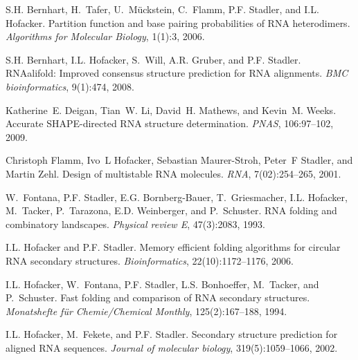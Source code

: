 
\begin{DoxyDescription}
\item[\label{_CITEREF_bernhart:2006}%
\mbox{[}1\mbox{]}]S.\+H. Bernhart, H.~Tafer, U.~M\"{u}ckstein, C.~Flamm, P.\+F. Stadler, and I.\+L. Hofacker. Partition function and base pairing probabilities of R\+N\+A heterodimers. {\itshape Algorithms for Molecular Biology}, 1(1)\+:3, 2006.


\item[\label{_CITEREF_bernhart:2008}%
\mbox{[}2\mbox{]}]S.\+H. Bernhart, I.\+L. Hofacker, S.~Will, A.\+R. Gruber, and P.\+F. Stadler. R\+N\+Aalifold\+: Improved consensus structure prediction for R\+N\+A alignments. {\itshape B\+M\+C bioinformatics}, 9(1)\+:474, 2008.


\item[\label{_CITEREF_deigan:2009}%
\mbox{[}3\mbox{]}]Katherine~E. Deigan, Tian~W. Li, David~H. Mathews, and Kevin~M. Weeks. Accurate S\+H\+A\+P\+E-\/directed R\+N\+A structure determination. {\itshape P\+N\+A\+S}, 106\+:97--102, 2009.


\item[\label{_CITEREF_flamm:2001}%
\mbox{[}4\mbox{]}]Christoph Flamm, Ivo~L Hofacker, Sebastian Maurer-\/\+Stroh, Peter~F Stadler, and Martin Zehl. Design of multistable R\+N\+A molecules. {\itshape R\+N\+A}, 7(02)\+:254--265, 2001.


\item[\label{_CITEREF_fontana:1993b}%
\mbox{[}5\mbox{]}]W.~Fontana, P.\+F. Stadler, E.\+G. Bornberg-\/\+Bauer, T.~Griesmacher, I.\+L. Hofacker, M.~Tacker, P.~Tarazona, E.\+D. Weinberger, and P.~Schuster. R\+N\+A folding and combinatory landscapes. {\itshape Physical review E}, 47(3)\+:2083, 1993.


\item[\label{_CITEREF_hofacker:2006}%
\mbox{[}6\mbox{]}]I.\+L. Hofacker and P.\+F. Stadler. Memory efficient folding algorithms for circular R\+N\+A secondary structures. {\itshape Bioinformatics}, 22(10)\+:1172--1176, 2006.


\item[\label{_CITEREF_hofacker:1994}%
\mbox{[}7\mbox{]}]I.\+L. Hofacker, W.~Fontana, P.\+F. Stadler, L.\+S. Bonhoeffer, M.~Tacker, and P.~Schuster. Fast folding and comparison of R\+N\+A secondary structures. {\itshape Monatshefte f\"{u}r Chemie/\+Chemical Monthly}, 125(2)\+:167--188, 1994.


\item[\label{_CITEREF_hofacker:2002}%
\mbox{[}8\mbox{]}]I.\+L. Hofacker, M.~Fekete, and P.\+F. Stadler. Secondary structure prediction for aligned R\+N\+A sequences. {\itshape Journal of molecular biology}, 319(5)\+:1059--1066, 2002.



\end{DoxyDescription}
